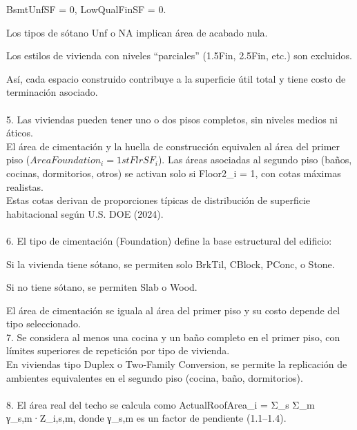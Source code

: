 \documentclass{article}
\begin{document}
BsmtUnfSF = 0, LowQualFinSF = 0.

Los tipos de sótano Unf o NA implican área de acabado nula.

Los estilos de vivienda con niveles “parciales” (1.5Fin, 2.5Fin, etc.) son excluidos.

Así, cada espacio construido contribuye a la superficie útil total y tiene costo de terminación asociado.\\
\\
5. Las viviendas pueden tener uno o dos pisos completos, sin niveles medios ni áticos.\\

El área de cimentación y la huella de construcción equivalen al área del primer piso ($AreaFoundation_i = 1stFlrSF_i$).
Las áreas asociadas al segundo piso (baños, cocinas, dormitorios, otros) se activan solo si Floor2_i = 1, con cotas máximas realistas.\\
Estas cotas derivan de proporciones típicas de distribución de superficie habitacional según U.S. DOE (2024).\\
\\
6. El tipo de cimentación (Foundation) define la base estructural del edificio:

Si la vivienda tiene sótano, se permiten solo BrkTil, CBlock, PConc, o Stone.

Si no tiene sótano, se permiten Slab o Wood.

El área de cimentación se iguala al área del primer piso y su costo depende del tipo seleccionado.\\

7. Se considera al menos una cocina y un baño completo en el primer piso, con límites superiores de repetición por tipo de vivienda.\\

En viviendas tipo Duplex o Two-Family Conversion, se permite la replicación de ambientes equivalentes en el segundo piso (cocina, baño, dormitorios).\\
\\
8. El área real del techo se calcula como
ActualRoofArea_i = Σ_s Σ_m γ_{s,m}·Z_{i,s,m},
donde γ_{s,m} es un factor de pendiente (1.1–1.4).
\end{document}
